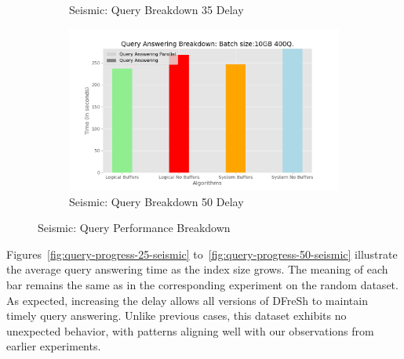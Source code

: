 \begin{figure}
\begin{subfigure}[c]{0.45\textwidth}
		\caption{Seismic: Query Breakdown 35 Delay}
		\label{fig:actual-query-breakdown-35-seismic}
	\end{subfigure}
	\begin{subfigure}[c]{0.45\textwidth}
		\includegraphics[width=1\textwidth]	 {figures/Experiments/Dynamic/SEISMIC/50/breakdown_seismic_50.png}
		\caption{Seismic: Query Breakdown 50 Delay}
		\label{fig:actual-query-breakdown-50-seismic}
	\end{subfigure}
	\caption{Seismic: Query Performance Breakdown}
	\label{fig:dfresh-query-breakdown-seismic}
\end{figure}

%
Figures~\ref{fig:query-progress-25-seismic} to~\ref{fig:query-progress-50-seismic} 
illustrate the average query answering time as the index size grows. The meaning of
each bar remains the same as in the corresponding experiment on the random dataset.
As expected, increasing the delay allows all versions of DFreSh to maintain timely
query answering. Unlike previous cases, this dataset exhibits no unexpected behavior,
with patterns aligning well with our observations from earlier experiments.

